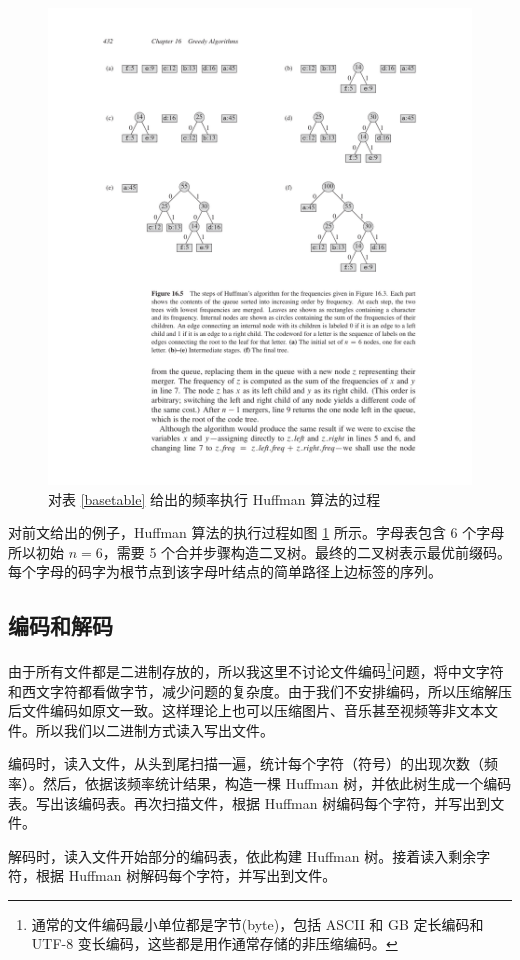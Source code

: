 \begin{figure}[htbp]
\centering
\includegraphics[trim=28mm 102mm 22mm 24mm,clip]{image/clrs_huffman.pdf}
\caption{\label{clrs_huffman}对表 \ref{basetable} 给出的频率执行 Huffman 算法的过程 \cite{clrs}}
\end{figure}

对前文给出的例子，Huffman 算法的执行过程如图 \ref{clrs_huffman} 所示。字母表包含 6 个字母所以初始 $n=6$，需要 5 个合并步骤构造二叉树。最终的二叉树表示最优前缀码。每个字母的码字为根节点到该字母叶结点的简单路径上边标签的序列。

\subsection{编码和解码}

由于所有文件都是二进制存放的，所以我这里不讨论文件编码\footnote{通常的文件编码最小单位都是字节(byte)，包括 ASCII 和 GB 定长编码和 UTF-8 变长编码，这些都是用作通常存储的非压缩编码。}问题，将中文字符和西文字符都看做字节，减少问题的复杂度。由于我们不安排编码，所以压缩解压后文件编码如原文一致。这样理论上也可以压缩图片、音乐甚至视频等非文本文件。所以我们以二进制方式读入写出文件。

编码时，读入文件，从头到尾扫描一遍，统计每个字符（符号）的出现次数（频率）。然后，依据该频率统计结果，构造一棵 Huffman 树，并依此树生成一个编码表。写出该编码表。再次扫描文件，根据 Huffman 树编码每个字符，并写出到文件。

解码时，读入文件开始部分的编码表，依此构建 Huffman 树。接着读入剩余字符，根据 Huffman 树解码每个字符，并写出到文件。
